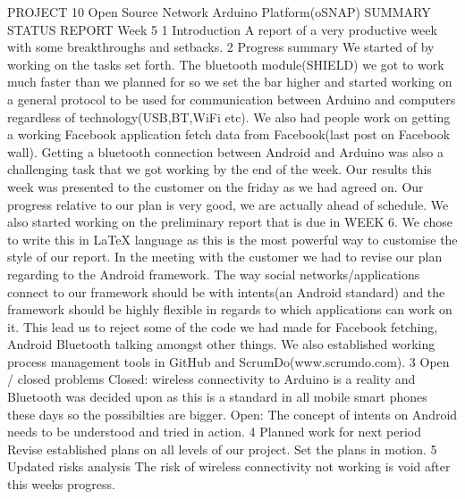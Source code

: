PROJECT 10 Open Source Network Arduino Platform(oSNAP)
SUMMARY STATUS REPORT
Week 5
1 Introduction
A report of a very productive week with some breakthroughs and setbacks.
2 Progress summary
We started of by working on the tasks set forth. The bluetooth module(SHIELD) we got to
work much faster than we planned for so we set the bar higher and started working on a
general protocol to be used for communication between Arduino and computers regardless
of technology(USB,BT,WiFi etc). We also had people work on getting a working Facebook
application fetch data from Facebook(last post on Facebook wall). Getting a bluetooth
connection between Android and Arduino was also a challenging task that we got working by
the end of the week. Our results this week was presented to the customer on the friday as
we had agreed on. Our progress relative to our plan is very good, we are actually ahead of
schedule.
We also started working on the preliminary report that is due in WEEK 6. We chose to write this
in LaTeX language as this is the most powerful way to customise the style of our report.
In the meeting with the customer we had to revise our plan regarding to the Android framework.
The way social networks/applications connect to our framework should be with intents(an
Android standard) and the framework should be highly flexible in regards to which applications
can work on it. This lead us to reject some of the code we had made for Facebook fetching,
Android Bluetooth talking amongst other things.
We also established working process management tools in GitHub and
ScrumDo(www.scrumdo.com).
3 Open / closed problems
Closed: wireless connectivity to Arduino is a reality and Bluetooth was decided upon as this is a
standard in all mobile smart phones these days so the possibilties are bigger.
Open:
The concept of intents on Android needs to be understood and tried in action.
4 Planned work for next period
Revise established plans on all levels of our project.
Set the plans in motion.
5 Updated risks analysis
The risk of wireless connectivity not working is void after this weeks progress.